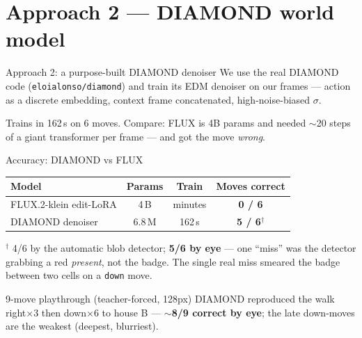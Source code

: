 \documentclass[aspectratio=169,11pt]{beamer}
\newcommand{\hit}{\textcolor{pine}{\faCheckCircle}}
\newcommand{\code}[1]{\texttt{\small #1}}
\begin{document}
\section{Approach 2 --- DIAMOND world model}
\begin{frame}{Approach 2: a purpose-built DIAMOND denoiser}
  We use the real DIAMOND code (\code{eloialonso/diamond}) and train its EDM
  denoiser on our frames --- action as a discrete embedding, context frame
  concatenated, high-noise-biased $\sigma$.
  \vspace{0.4em}
  \begin{center}
  \end{center}
  \footnotesize\alert{Trains in 162\,s} on 6 moves. Compare: FLUX is 4B params
  and needed $\sim$20 steps of a giant transformer per frame --- and got the
  move \emph{wrong}.
\end{frame}

\begin{frame}{Accuracy: DIAMOND vs FLUX}
  \centering
  \begin{tabular}{@{}lccc@{}}
    \toprule
    \textbf{Model} & \textbf{Params} & \textbf{Train} & \textbf{Moves correct} \\
    \midrule
    FLUX.2-klein edit-LoRA & 4\,B      & minutes & \textcolor{ink}{\textbf{0 / 6}} \\
    \alert{DIAMOND denoiser}& \alert{6.8\,M} & \alert{162\,s} & \textbf{5 / 6}$^{\dagger}$ \hit \\
    \bottomrule
  \end{tabular}

  \vspace{0.9em}
  \footnotesize
  $^{\dagger}$ 4/6 by the automatic blob detector; \textbf{5/6 by eye} --- one
  ``miss'' was the detector grabbing a red \emph{present}, not the badge.
  The single real miss smeared the badge between two cells on a \code{down} move.

  \vspace{0.8em}
  \begin{block}{9-move playthrough (teacher-forced, 128px)}
    \centering DIAMOND reproduced the walk right$\times$3 then down$\times$6 to house B ---
    \textbf{$\sim$8/9 correct by eye}; the late down-moves are the weakest (deepest, blurriest).
  \end{block}
\end{frame}
\end{document}
